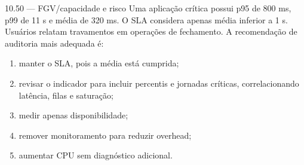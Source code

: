 \begin{questao}{ 10.50 — FGV/capacidade e risco}
Uma aplicação crítica possui p95 de 800 ms, p99 de 11 s e média de 320 ms. O SLA considera apenas média inferior a 1 s. Usuários relatam travamentos em operações de fechamento. A recomendação de auditoria mais adequada é:
\begin{enumerate}[label=\Alph*)]
\item manter o SLA, pois a média está cumprida;
\item revisar o indicador para incluir percentis e jornadas críticas, correlacionando latência, filas e saturação;
\item medir apenas disponibilidade;
\item remover monitoramento para reduzir overhead;
\item aumentar CPU sem diagnóstico adicional.
\end{enumerate}
\end{questao}
